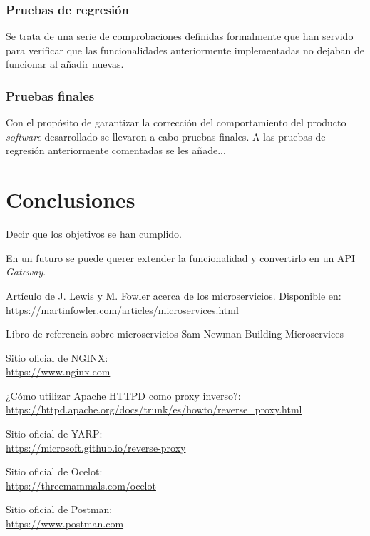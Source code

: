 \documentclass[11pt,spanish,listoffigures]{tfgetsinf}
\begin{document}
\subsection{Pruebas de regresión}

Se trata de una serie de comprobaciones definidas formalmente que han servido para verificar que las funcionalidades anteriormente implementadas no dejaban de funcionar al añadir nuevas.

\subsection{Pruebas finales}

Con el propósito de garantizar la corrección del comportamiento del producto \emph{software} desarrollado se llevaron a cabo pruebas finales. A las pruebas de regresión anteriormente comentadas se les añade...


\chapter{Conclusiones}

Decir que los objetivos se han cumplido.

En un futuro se puede querer extender la funcionalidad y convertirlo en un API \emph{Gateway}.


\begin{thebibliography}{10}

Artículo de J. Lewis y M. Fowler acerca de los microservicios.
\newblock Disponible en:\\
\url{https://martinfowler.com/articles/microservices.html}

Libro de referencia sobre microservicios
\newblock Sam Newman
\newblock Building Microservices

Sitio oficial de NGINX:\\
\url{https://www.nginx.com}

¿Cómo utilizar Apache HTTPD como proxy inverso?:\\
\url{https://httpd.apache.org/docs/trunk/es/howto/reverse_proxy.html}

Sitio oficial de YARP:\\
\url{https://microsoft.github.io/reverse-proxy}

Sitio oficial de Ocelot:\\
\url{https://threemammals.com/ocelot}

Sitio oficial de Postman:\\
\url{https://www.postman.com}

\end{thebibliography}
\end{document}
